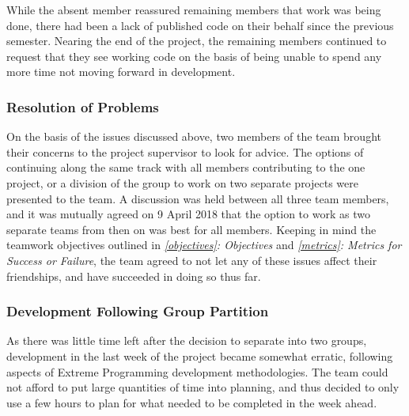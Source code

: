 While the absent member reassured remaining members that work was being done, there had been a lack of published code on their behalf since the previous semester. Nearing the end of the project, the remaining members continued to request that they see working code on the basis of being unable to spend any more time not moving forward in development. 

\subsubsection{Resolution of Problems}
On the basis of the issues discussed above, two members of the team brought their concerns to the project supervisor to look for advice. The options of continuing along the same track with all members contributing to the one project, or a division of the group to work on two separate projects were presented to the team. A discussion was held between all three team members, and it was mutually agreed on 9 April 2018 that the option to work as two separate teams from then on was best for all members. Keeping in mind the teamwork objectives outlined in \textit{\ref{objectives}: Objectives} and \textit{\ref{metrics}: Metrics for Success or Failure}, the team agreed to not let any of these issues affect their friendships, and have succeeded in doing so thus far.

\subsubsection{Development Following Group Partition}
As there was little time left after the decision to separate into two groups, development in the last week of the project became somewhat erratic, following aspects of Extreme Programming development methodologies. The team could not afford to put large quantities of time into planning, and thus decided to only use a few hours to plan for what needed to be completed in the week ahead. 

